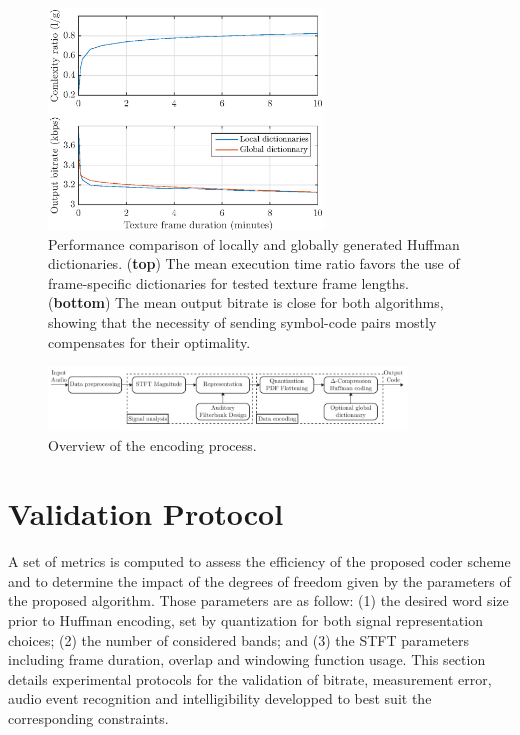 \documentclass[sensors,article,accept,moreauthors,pdftex,10pt,a4paper]{mdpi}
\begin{document}
\begin{figure}[H]
	\centering
		\includegraphics[width=0.65\textwidth]{figures/dict_comp.eps}
	\caption{Performance comparison of locally and globally generated Huffman dictionaries. (\textbf{top}) The mean execution time ratio favors the use of frame-specific dictionaries for tested texture frame lengths. (\textbf{bottom}) The mean output bitrate is close for both algorithms, showing that the necessity of sending symbol-code pairs mostly compensates for their optimality.}
	\label{fig:dict_comp}
\end{figure}
\unskip
\begin{figure}[H]
	\centering
		\includegraphics[width=0.85\textwidth]{figures/scheme.pdf}
	\caption{Overview of the encoding process.}
	\label{fig:scheme}
\end{figure}

\section{Validation Protocol} \label{sec:protocol}

A set of metrics is computed to assess the efficiency of the proposed coder scheme and to determine the impact of the degrees of freedom given by the parameters of the proposed algorithm. Those parameters are as follow: (1) the desired word size prior to Huffman encoding, set by quantization for both signal representation choices; (2) the number of considered bands; and (3) the STFT parameters including frame duration, overlap and windowing function usage. This section details experimental protocols for the validation of bitrate, measurement error, audio event recognition and intelligibility developped to best suit the corresponding constraints.
\end{document}
